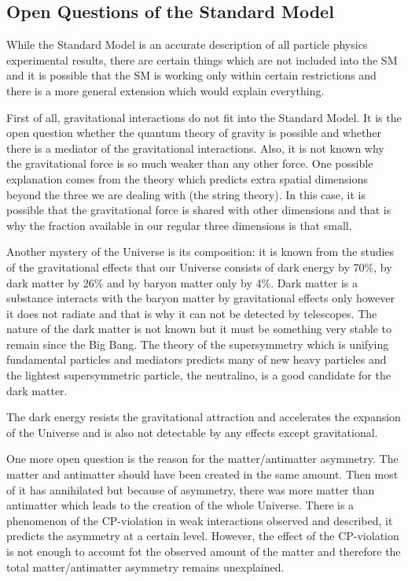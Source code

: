 \subsection{Open Questions of the Standard Model}

While the Standard Model is an accurate description of all particle physics experimental results, there are certain things which are not included into the SM and it is possible that the SM is working only within certain restrictions and there is a more general extension which would explain everything.

First of all, gravitational interactions do not fit into the Standard Model. It is the open question whether the quantum theory of gravity is possible and whether there is a mediator of the gravitational interactions. Also, it is not known why the gravitational force is so much weaker than any other force. One possible explanation comes from the theory which predicts extra spatial dimensions beyond the three we are dealing with (the string theory). In this case, it is possible that the gravitational force is shared with other dimensions and that is why the fraction available in our regular three dimensions is that small.

Another mystery of the Universe is its composition: it is known from the studies of the gravitational effects that our Universe consists of dark energy by 70\%, by dark matter by 26\% and by baryon matter only by 4\%. Dark matter is a substance interacts with the baryon matter by gravitational effects only however it does not radiate and that is why it can not be detected by telescopes. The nature of the dark matter is not known but it must be something very stable to remain since the Big Bang. 
The theory of the supersymmetry which is unifying fundamental particles and mediators predicts many of new heavy particles and the lightest supersymmetric particle, the neutralino, is a good candidate for the dark matter.

The dark energy resists the gravitational attraction and accelerates the expansion of the Universe and is also not detectable by any effects except gravitational. 

One more open question is the reason for the matter/antimatter asymmetry. The matter and antimatter should have been created in the same amount. Then most of it has annihilated but because of asymmetry, there was more matter than antimatter which leads to the creation of the whole Universe. There is a phenomenon of the CP-violation in weak interactions observed and described, it predicts the asymmetry at a certain level. However, the effect of the CP-violation is not enough to account fot the observed amount of the matter and therefore the total matter/antimatter asymmetry remains unexplained. 


